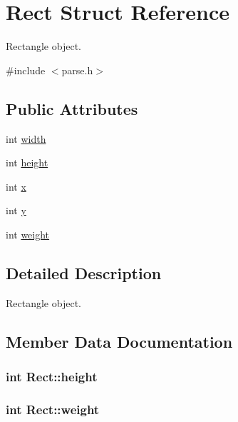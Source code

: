 \hypertarget{structRect}{}\section{Rect Struct Reference}
\label{structRect}


Rectangle object.  




{\ttfamily \#include $<$parse.\+h$>$}

\subsection*{Public Attributes}
\begin{DoxyCompactItemize}
\item 
int \hyperlink{structRect_a367714e71d566668addb140c7981b5bc}{width}
\item 
int \hyperlink{structRect_ad79d7bf12771a81627a672452437011d}{height}
\item 
int \hyperlink{structRect_a64d1ef14e429e1816539de4c54361e55}{x}
\item 
int \hyperlink{structRect_a1e37b6f8a4fb0d68ba22c8fffffab0a4}{y}
\item 
int \hyperlink{structRect_a650bf46fd8e7a6fcb5a5ea8241e808d8}{weight}
\end{DoxyCompactItemize}


\subsection{Detailed Description}
Rectangle object. 

\subsection{Member Data Documentation}
\hypertarget{structRect_ad79d7bf12771a81627a672452437011d}{}
\subsubsection[{height}]{\setlength{\rightskip}{0pt plus 5cm}int Rect\+::height}\label{structRect_ad79d7bf12771a81627a672452437011d}
\hypertarget{structRect_a650bf46fd8e7a6fcb5a5ea8241e808d8}{}
\subsubsection[{weight}]{\setlength{\rightskip}{0pt plus 5cm}int Rect\+::weight}\label{structRect_a650bf46fd8e7a6fcb5a5ea8241e808d8}
\hypertarget{structRect_a367714e71d566668addb140c7981b5bc}{}
